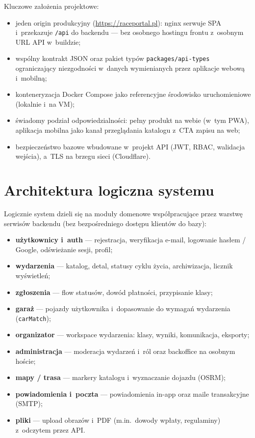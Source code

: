 \documentclass{sprz}
\begin{document}
Kluczowe założenia projektowe:
\begin{itemize}
  \item jeden origin produkcyjny (\url{https://raceportal.pl}): nginx serwuje SPA i~przekazuje \texttt{/api} do backendu --- bez osobnego hostingu frontu z~osobnym URL API w~buildzie;
  \item wspólny kontrakt JSON oraz pakiet typów \texttt{packages/api-types} ograniczający niezgodności w~danych wymienianych przez aplikacje webową i~mobilną;
  \item konteneryzacja Docker Compose jako referencyjne środowisko uruchomieniowe (lokalnie i~na VM);
  \item świadomy podział odpowiedzialności: pełny produkt na webie (w~tym PWA), aplikacja mobilna jako kanał przeglądania katalogu z~CTA zapisu na web;
  \item bezpieczeństwo bazowe wbudowane w~projekt API (JWT, RBAC, walidacja wejścia), a~TLS na brzegu sieci (Cloudflare).
\end{itemize}

\section{Architektura logiczna systemu}
Logicznie system dzieli się na moduły domenowe współpracujące przez warstwę serwisów backendu (bez bezpośredniego dostępu klientów do bazy):
\begin{itemize}
  \item \textbf{użytkownicy i~auth} --- rejestracja, weryfikacja e-mail, logowanie hasłem / Google, odświeżanie sesji, profil;
  \item \textbf{wydarzenia} --- katalog, detal, statusy cyklu życia, archiwizacja, licznik wyświetleń;
  \item \textbf{zgłoszenia} --- flow statusów, dowód płatności, przypisanie klasy;
  \item \textbf{garaż} --- pojazdy użytkownika i~dopasowanie do wymagań wydarzenia (\texttt{carMatch});
  \item \textbf{organizator} --- workspace wydarzenia: klasy, wyniki, komunikacja, eksporty;
  \item \textbf{administracja} --- moderacja wydarzeń i~ról oraz backoffice na osobnym hoście;
  \item \textbf{mapy / trasa} --- markery katalogu i~wyznaczanie dojazdu (OSRM);
  \item \textbf{powiadomienia i~poczta} --- powiadomienia in-app oraz maile transakcyjne (SMTP);
  \item \textbf{pliki} --- upload obrazów i~PDF (m.in.\ dowody wpłaty, regulaminy) z~odczytem przez API.
\end{itemize}
\end{document}
